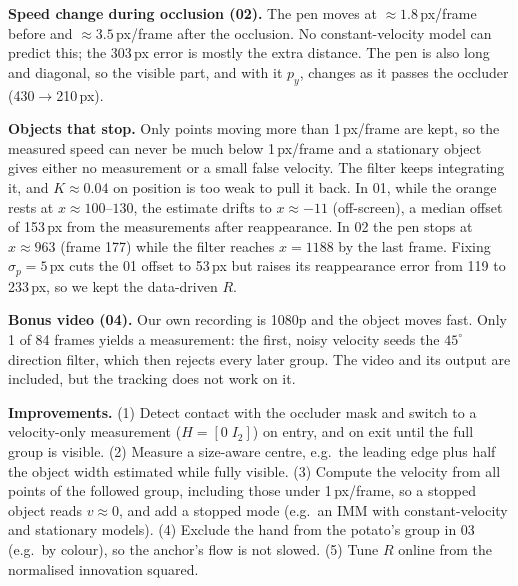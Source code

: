 \documentclass[conference]{assets/latex/IEEEtran}
\begin{document}
\textbf{Speed change during occlusion (02).} The pen moves at ${\approx}1.8$\,px/frame before and ${\approx}3.5$\,px/frame after the occlusion. No constant-velocity model can predict this; the 303\,px error is mostly the extra distance. The pen is also long and diagonal, so the visible part, and with it $p_y$, changes as it passes the occluder (430$\to$210\,px).

\textbf{Objects that stop.} Only points moving more than 1\,px/frame are kept, so the measured speed can never be much below 1\,px/frame and a stationary object gives either no measurement or a small false velocity. The filter keeps integrating it, and $K\approx0.04$ on position is too weak to pull it back. In 01, while the orange rests at $x\approx100$--$130$, the estimate drifts to $x\approx-11$ (off-screen), a median offset of 153\,px from the measurements after reappearance. In 02 the pen stops at $x\approx963$ (frame 177) while the filter reaches $x=1188$ by the last frame. Fixing $\sigma_p=5$\,px cuts the 01 offset to 53\,px but raises its reappearance error from 119 to 233\,px, so we kept the data-driven $R$.

\textbf{Bonus video (04).} Our own recording is 1080p and the object moves fast. Only 1 of 84 frames yields a measurement: the first, noisy velocity seeds the $45^\circ$ direction filter, which then rejects every later group. The video and its output are included, but the tracking does not work on it.

\textbf{Improvements.} (1) Detect contact with the occluder mask and switch to a velocity-only measurement ($H=[0\;I_2]$) on entry, and on exit until the full group is visible. (2) Measure a size-aware centre, e.g.\ the leading edge plus half the object width estimated while fully visible. (3) Compute the velocity from all points of the followed group, including those under 1\,px/frame, so a stopped object reads $v\approx0$, and add a stopped mode (e.g.\ an IMM with constant-velocity and stationary models). (4) Exclude the hand from the potato's group in 03 (e.g.\ by colour), so the anchor's flow is not slowed. (5) Tune $R$ online from the normalised innovation squared.
\end{document}
